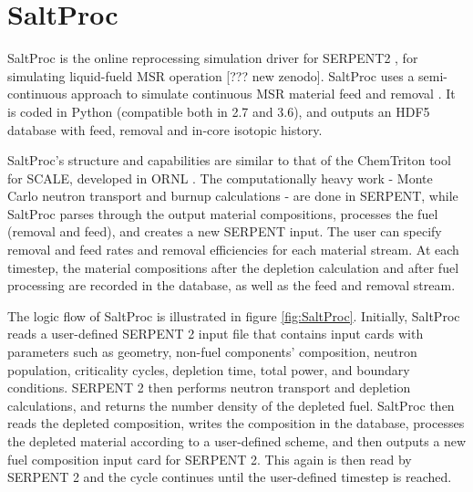 \section{SaltProc}

SaltProc is the online reprocessing simulation
driver for SERPENT2 \cite{leppanen_serpent_2015},
for simulating liquid-fueld \gls{MSR} operation [??? new zenodo].
SaltProc uses a semi-continuous approach to simulate
continuous \gls{MSR} material feed and removal \cite{rykhlevskii_online_2017}.
It is coded in Python (compatible both in 2.7 and 3.6), and
outputs an HDF5 \cite{the_hdf_group_hierarchical_1997} database
with feed, removal and in-core isotopic history.

SaltProc's structure and capabilities are similar to that of the
ChemTriton tool for SCALE, developed in ORNL \cite{betzler_molten_2017}.
The computationally heavy work - Monte Carlo neutron transport and
burnup calculations - are done in SERPENT, while SaltProc parses through
the output material compositions, processes the fuel (removal and feed),
and creates a new SERPENT input. The user can specify removal and feed
rates and removal efficiencies for each material stream. At each
timestep, the material compositions after the
depletion calculation and after fuel processing are recorded in the
database, as well as the feed and removal stream. 

The logic flow of SaltProc is illustrated in figure \ref{fig:SaltProc}.
Initially, SaltProc reads a user-defined SERPENT 2 input file that
contains input cards with parameters such as  geometry, non-fuel components' composition,
neutron population, criticality cycles, depletion time, total power, and boundary conditions.
SERPENT 2 then performs neutron transport and depletion calculations, and 
returns the number density of the depleted fuel. SaltProc then reads the
depleted composition, writes the composition in the database, processes
the depleted material according to a user-defined scheme, and then
outputs a new fuel composition input card for SERPENT 2. This again
is then read by SERPENT 2 and the cycle continues until the user-defined
timestep is reached.

